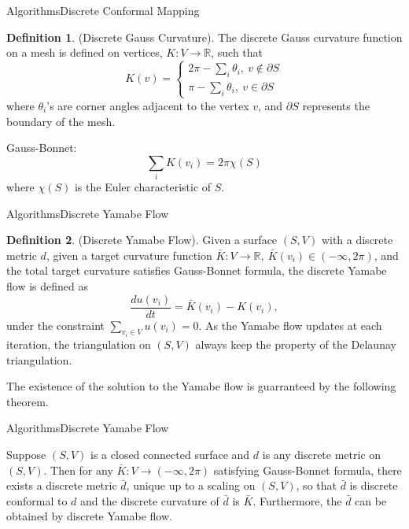 \documentclass{beamer}
\theoremstyle{definition}
\newtheorem{mydef}{Definition}
\begin{document}
\begin{frame}{Algorithms}{Discrete Conformal Mapping}
\begin{mydef}
(Discrete Gauss Curvature). The discrete Gauss curvature function on a mesh is defined on vertices, $K: V\rightarrow \mathbb{R}$, such that
\[
	K(v)=\begin{cases}
			2\pi-\sum_i\theta_i,\ v\notin\partial S\\
			\pi-\sum_i\theta_i, \ v\in\partial S
		\end{cases}			
\]
where $\theta_i$'s are corner angles adjacent to the vertex $v$, and $\partial S$ represents the boundary of the mesh.

Gauss-Bonnet:
$$\sum_i K(v_i)=2\pi\chi(S)$$
where $\chi(S)$ is the Euler characteristic of $S$.
\end{mydef}
\end{frame}

\begin{frame}{Algorithms}{Discrete Yamabe Flow}
\begin{mydef}
(Discrete Yamabe Flow). Given a surface $(S,V)$ with a discrete metric $d$, given a target curvature function $\bar{K}:V\rightarrow \mathbb{R},\ \bar{K}(v_i)\in(-\infty,2\pi)$, and the total target curvature satisfies Gauss-Bonnet formula, the discrete Yamabe flow is defined as $$\dfrac{du(v_i)}{dt}=\bar{K}(v_i)-K(v_i),$$
under the constraint $\sum_{v_i\in V}u(v_i) = 0$. As the Yamabe flow updates at each iteration, the triangulation on $(S,V)$ always keep the property of the Delaunay triangulation.


\end{mydef}
The existence of the solution to the Yamabe flow is guarranteed by the following theorem.
\end{frame}

\begin{frame}{Algorithms}{Discrete Yamabe Flow}
\begin{theorem}
Suppose $(S,V)$ is a closed connected surface and $d$ is any discrete metric on $(S,V)$. Then for any $\bar{K}:V\rightarrow (-\infty,2\pi)$ satisfying Gauss-Bonnet formula, there exists a discrete metric $\bar{d}$, unique up to a scaling on $(S,V)$, so that $\bar{d}$ is discrete conformal to $d$ and the discrete curvature of $\bar{d}$ is $\bar{K}$. Furthermore, the $\bar{d}$ can be obtained by discrete Yamabe flow.
\end{theorem}
\end{frame}
\end{document}
